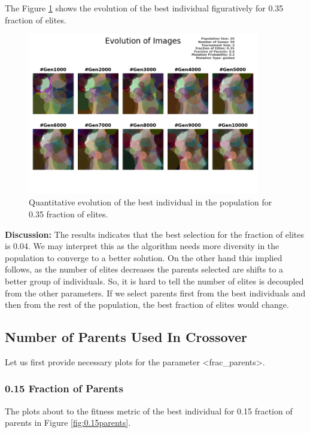 \documentclass{assignment}
\begin{document}
The Figure \ref{fig:0.35elites_image} shows the evolution of the best individual figuratively for 0.35 fraction of elites.

\begin{figure}[!htb]
    \centering
    \includegraphics[width=0.9\textwidth]{figures/images_output_20_50_5_0.35_0.6_0.2_guided.png}
    \caption{Quantitative evolution of the best individual in the population for 0.35 fraction of elites.}
    \label{fig:0.35elites_image}
\end{figure}

\textbf{Discussion:} The results indicates that the best selection for the fraction of elites is 0.04. We may interpret this as the algorithm needs more diversity in the population to converge to a better solution. On the other hand this implied follows, as the number of elites decreases the parents selected are shifts to a better group of individuals. So, it is hard to tell the number of elites is decoupled from the other parameters. If we select parents first from the best individuals and then from the rest of the population, the best fraction of elites would change.

\subsection{Number of Parents Used In Crossover}

Let us first provide necessary plots for the parameter \textless{}frac\_parents\textgreater{}.

\subsubsection{0.15 Fraction of Parents}
The plots about to the fitness metric of the best individual for 0.15 fraction of parents in Figure \ref{fig:0.15parents}.
\end{document}
